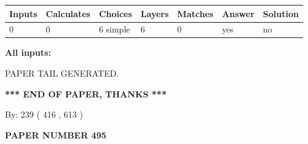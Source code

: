 \documentclass[12pt]{article}
\begin{document}
 
\noindent{}
 
 
   
   
   
   
\noindent\begin{tabular}{|l|l|l|l|l|l|l|}
 \hline
Inputs & Calculates & Choices & Layers & Matches & Answer & Solution \\ \hline
 0  & 
 0  & 
 6
  simple  
  & 
 6  & 
 0  & 
  yes & 
  no 
  \\ \hline
 \end{tabular}
   
   
   
   
\noindent{}
   
   
   
   
\noindent\vspace{0.1in}\hspace{-0.08in} {\textbf{\Large{All inputs: }}}
   
   
   
   
   
   
 \vspace{0.2in}
 
   
   
\vspace{2.0in} PAPER TAIL GENERATED.
   
   
   
   
\vspace{1.0in} 
{\textbf{\large{ *** END OF PAPER, THANKS *** }}} 
   
   
\hspace{1.0in} By: 
 239 ( 416 ,  613 )
   
   
   
   
\newpage 
\setcounter{page}{ 
   495001 } 
   
   
   
   
 {\textbf{ \Large{ PAPER NUMBER  495  }}}
   
   
\vspace{0.2in}
   
   
   
   
   
   
   
   
 \vspace{0.2in}
 
\end{document}
